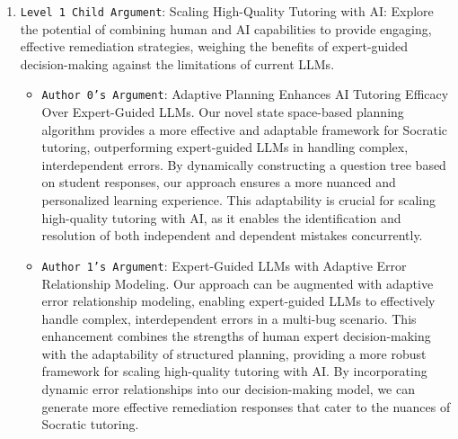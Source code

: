 \begin{enumerate}
    \item \texttt{Level 1 Child Argument}: Scaling High-Quality Tutoring with AI: Explore the potential of combining human and AI capabilities to provide engaging, effective remediation strategies, weighing the benefits of expert-guided decision-making against the limitations of current LLMs.
    \begin{itemize}
        \item \texttt{Author 0's Argument}:  Adaptive Planning Enhances AI Tutoring Efficacy Over Expert-Guided LLMs. Our novel state space-based planning algorithm provides a more effective and adaptable framework for Socratic tutoring, outperforming expert-guided LLMs in handling complex, interdependent errors. By dynamically constructing a question tree based on student responses, our approach ensures a more nuanced and personalized learning experience. This adaptability is crucial for scaling high-quality tutoring with AI, as it enables the identification and resolution of both independent and dependent mistakes concurrently.
	\item \texttt{Author 1's Argument}:  Expert-Guided LLMs with Adaptive Error Relationship Modeling. Our approach can be augmented with adaptive error relationship modeling, enabling expert-guided LLMs to effectively handle complex, interdependent errors in a multi-bug scenario. This enhancement combines the strengths of human expert decision-making with the adaptability of structured planning, providing a more robust framework for scaling high-quality tutoring with AI. By incorporating dynamic error relationships into our decision-making model, we can generate more effective remediation responses that cater to the nuances of Socratic tutoring.
    \end{itemize}


\end{enumerate}
